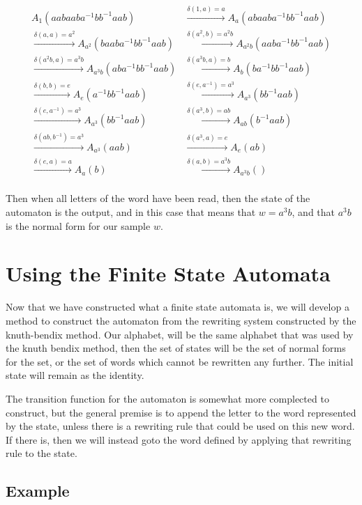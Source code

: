 \documentclass[10pt]{amsart}
\theoremstyle{definition}
\theoremstyle{remark}
\begin{document}
\begin{align*}
  A_1(aabaaba^{-1}bb^{-1}aab)&\xrightarrow{\delta(1,a)=a}A_a(abaaba^{-1}bb^{-1}aab)\\
  \xrightarrow{\delta(a,a)=a^2}A_{a^2}(baaba^{-1}bb^{-1}aab)
  &\xrightarrow{\delta(a^2,b)=a^2b}A_{a^2b}(aaba^{-1}bb^{-1}aab)\\
  \xrightarrow{\delta(a^2b,a)=a^3b}A_{a^3b}(aba^{-1}bb^{-1}aab)
  &\xrightarrow{\delta(a^3b,a)=b}A_{b}(ba^{-1}bb^{-1}aab)\\
  \xrightarrow{\delta(b,b)=e}A_{e}(a^{-1}bb^{-1}aab)
  &\xrightarrow{\delta(e,a^{-1})=a^3}A_{a^3}(bb^{-1}aab)\\
  \xrightarrow{\delta(e,a^{-1})=a^3}A_{a^3}(bb^{-1}aab)
  &\xrightarrow{\delta(a^3,b)=ab}A_{ab}(b^{-1}aab)\\
  \xrightarrow{\delta(ab,b^{-1})=a^3}A_{a^3}(aab)
  &\xrightarrow{\delta(a^3,a)=e}A_{e}(ab)\\
  \xrightarrow{\delta(e,a)=a}A_{a}(b)
  &\xrightarrow{\delta(a,b)=a^3b}A_{a^3b}()\\
\end{align*}

Then when all letters of the word have been read, then the state of the
automaton is the output, and in this case that means that $w=a^3b$, and that
$a^3b$ is the normal form for our sample $w$.

\section{Using the Finite State Automata}%
\label{sec:Using the Finite State Automata}

Now that we have constructed what a finite state automata is, we will develop a
method to construct the automaton from the rewriting system constructed by the
knuth-bendix method. Our alphabet, will be the same alphabet that was used by
the knuth bendix method, then the set of states will be the set of normal forms
for the set, or the set of words which cannot be rewritten any further. The
initial state will remain as the identity.

The transition function for the automaton is somewhat more complected to
construct, but the general premise is to append the letter to the word 
represented by the state, unless there is a rewriting rule that could be used
on this new word. If there is, then we will instead goto the word defined by
applying that rewriting rule to the state.

\subsection{Example}
\label{sub:fsa_example}
\end{document}
